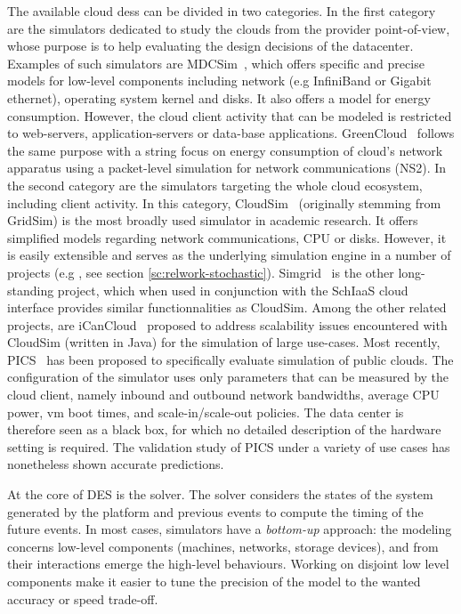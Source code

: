The available  cloud \acp{des} can  be divided in  two categories. In  the first
category are  the simulators  dedicated to  study the  clouds from  the provider
point-of-view, whose purpose  is to help evaluating the design  decisions of the
datacenter. Examples  of such simulators are  MDCSim~\cite{MDCSim}, which offers
specific  and precise  models for  low-level components  including network  (e.g
InfiniBand or  Gigabit ethernet),  operating system kernel  and disks.   It also
offers a model  for energy consumption. However, the cloud  client activity that
can be  modeled is restricted  to web-servers, application-servers  or data-base
applications.   GreenCloud~\cite{greencloud} follows  the  same  purpose with  a
string  focus  on  energy  consumption  of cloud's  network  apparatus  using  a
packet-level  simulation  for  network  communications  (NS2).   In  the  second
category  are the  simulators  targeting the  whole  cloud ecosystem,  including
client activity. In this category, CloudSim~\cite{cloudsim} (originally stemming
from  GridSim) is  the most  broadly used  simulator in  academic research.   It
offers   simplified   models   regarding    network   communications,   CPU   or
disks. However, it is easily extensible  and serves as the underlying simulation
engine   in   a   number   of    projects   (e.g   \cite{Cai17},   see   section
\ref{sc:relwork-stochastic}).  Simgrid~\cite{simgrid} is the other long-standing
project,  which  when used  in  conjunction  with  the SchIaaS  cloud  interface
provides  similar  functionnalities  as   CloudSim.   Among  the  other  related
projects, are iCanCloud~\cite{iCanCloud} proposed  to address scalability issues
encountered  with  CloudSim  (written  in  Java) for  the  simulation  of  large
use-cases.  Most recently,  PICS~\cite{pics} has  been proposed  to specifically
evaluate simulation of  public clouds.  The configuration of  the simulator uses
only parameters  that can be  measured by the  cloud client, namely  inbound and
outbound  network  bandwidths,  average  CPU  power,  \ac{vm}  boot  times,  and
scale-in/scale-out policies. The  data center is therefore seen as  a black box,
for which  no detailed  description of  the hardware  setting is  required.  The
validation study  of PICS  under a  variety of use  cases has  nonetheless shown
accurate predictions.

At the core of DES is the solver.  The solver considers the states of the system
generated  by the  platform and  previous events  to compute  the timing  of the
future events. In most cases,  simulators have a \emph{bottom-up} approach: the
modeling concerns  low-level components  (machines, networks,  storage devices),
and  from  their  interactions  emerge the  high-level  behaviours.  Working  on
disjoint low level components make it easier  to tune the precision of the model
to the wanted accuracy or speed trade-off.

